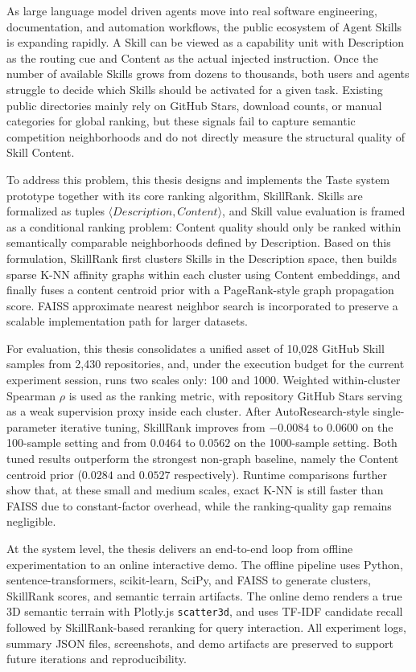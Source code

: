 \begin{abstract*}
  As large language model driven agents move into real software engineering, documentation, and automation workflows, the public ecosystem of Agent Skills is expanding rapidly. A Skill can be viewed as a capability unit with Description as the routing cue and Content as the actual injected instruction. Once the number of available Skills grows from dozens to thousands, both users and agents struggle to decide which Skills should be activated for a given task. Existing public directories mainly rely on GitHub Stars, download counts, or manual categories for global ranking, but these signals fail to capture semantic competition neighborhoods and do not directly measure the structural quality of Skill Content.

  To address this problem, this thesis designs and implements the Taste system prototype together with its core ranking algorithm, SkillRank. Skills are formalized as tuples $\langle Description, Content \rangle$, and Skill value evaluation is framed as a conditional ranking problem: Content quality should only be ranked within semantically comparable neighborhoods defined by Description. Based on this formulation, SkillRank first clusters Skills in the Description space, then builds sparse K-NN affinity graphs within each cluster using Content embeddings, and finally fuses a content centroid prior with a PageRank-style graph propagation score. FAISS approximate nearest neighbor search is incorporated to preserve a scalable implementation path for larger datasets.

  For evaluation, this thesis consolidates a unified asset of 10,028 GitHub Skill samples from 2,430 repositories, and, under the execution budget for the current experiment session, runs two scales only: 100 and 1000. Weighted within-cluster Spearman $\rho$ is used as the ranking metric, with repository GitHub Stars serving as a weak supervision proxy inside each cluster. After AutoResearch-style single-parameter iterative tuning, SkillRank improves from $-0.0084$ to $0.0600$ on the 100-sample setting and from $0.0464$ to $0.0562$ on the 1000-sample setting. Both tuned results outperform the strongest non-graph baseline, namely the Content centroid prior ($0.0284$ and $0.0527$ respectively). Runtime comparisons further show that, at these small and medium scales, exact K-NN is still faster than FAISS due to constant-factor overhead, while the ranking-quality gap remains negligible.

  At the system level, the thesis delivers an end-to-end loop from offline experimentation to an online interactive demo. The offline pipeline uses Python, sentence-transformers, scikit-learn, SciPy, and FAISS to generate clusters, SkillRank scores, and semantic terrain artifacts. The online demo renders a true 3D semantic terrain with Plotly.js \texttt{scatter3d}, and uses TF-IDF candidate recall followed by SkillRank-based reranking for query interaction. All experiment logs, summary JSON files, screenshots, and demo artifacts are preserved to support future iterations and reproducibility.
\end{abstract*}
